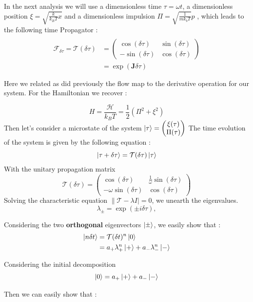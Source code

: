 \documentclass[ansiapaper]{report}
\begin{document}
\begin{multicols}{3}
	In the next analysis we will use a dimensionless time $\tau = \omega t$,  a dimensionless position $\xi = \sqrt{\frac{k}{k_BT}x}$ and a dimensionless impulsion $\Pi = \sqrt{\frac{1}{mk_bT}}p$ , which leads to the following time Propagator :
	\begin{align*}
		\\ \mathcal{F}_{\delta \tau} = \mathcal{T}(\delta \tau) &=  \left(\begin{array}{cc}
				\cos(\delta \tau)   & \sin(\delta \tau) \\
				- \sin(\delta \tau) & \cos(\delta \tau)
			\end{array}
		\right)
		\\ &=  \exp(\textbf{J} \delta \tau)
	\end{align*}

	Here we related as did previously the flow map to the derivative operation for our system.
	For the Hamiltonian we recover :

	$$ H = \frac{\mathcal{H}}{k_BT} = \frac{1}{2}(\Pi^2 + \xi^2)$$ Then let's consider a microstate of the system $\ket{\tau} = \begin{pmatrix}
			\xi(\tau) \\
			\Pi(\tau)
		\end{pmatrix}$
	The time evolution of the system is given by the following equation :
	$$ \ket{\tau + \delta \tau} = \mathcal{T}(\delta \tau) \ket{\tau}$$
	With the unitary propagation matrix $$\mathcal{T}(\delta \tau) = \begin{pmatrix}
			\cos(\delta \tau)         & \frac{1}{\omega}\sin(\delta \tau) \\
			-\omega \sin(\delta \tau) & \cos(\delta \tau)
		\end{pmatrix}$$
	Solving the characteristic equation $\lVert \mathcal{T} - \lambda I\rvert = 0$, we unearth the eigenvalues.
	$$ \lambda_\pm = \exp(\pm i \delta \tau), $$

	Considering the two \textbf{orthogonal}  eigenvectors $\ket{\pm}$, we easily show that :
	\begin{align*}
		\ket{n \delta t} & = \mathcal{T}(\delta t)^n \ket{0}                   \\
		                 & = a_+ \lambda_+^n \ket{+} + a_- \lambda_-^n \ket{-} \\
	\end{align*}

	Considering the initial decomposition $$ \ket{0} = a_+ \ket{+} + a_- \ket{-}$$

	Then we can easily show that :


\end{multicols}
\end{document}
